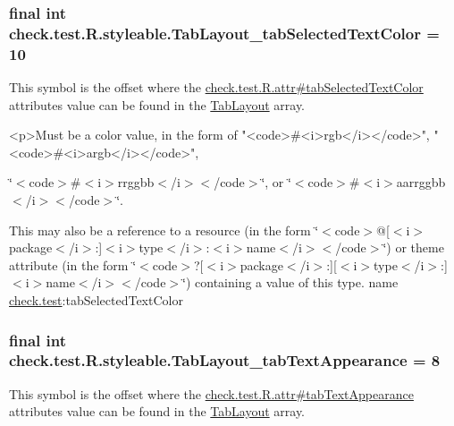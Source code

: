 \subsubsection[{Tab\+Layout\+\_\+tab\+Selected\+Text\+Color}]{\setlength{\rightskip}{0pt plus 5cm}final int check.\+test.\+R.\+styleable.\+Tab\+Layout\+\_\+tab\+Selected\+Text\+Color = 10\hspace{0.3cm}{\ttfamily [static]}}\label{classcheck_1_1test_1_1_r_1_1styleable_a8de68a289b7ff055235fa32b1699d7c0}
This symbol is the offset where the \hyperlink{classcheck_1_1test_1_1_r_1_1attr_a270a1ff857735c964f5bcf59290f4b71}{check.\+test.\+R.\+attr\#tab\+Selected\+Text\+Color} attribute\textquotesingle{}s value can be found in the \hyperlink{classcheck_1_1test_1_1_r_1_1styleable_a2a3232e8d38a43f5131a16385abbbed8}{Tab\+Layout} array.

\begin{DoxyVerb}      <p>Must be a color value, in the form of "<code>#<i>rgb</i></code>", "<code>#<i>argb</i></code>",
\end{DoxyVerb}
 \char`\"{}$<$code$>$\#$<$i$>$rrggbb$<$/i$>$$<$/code$>$\char`\"{}, or \char`\"{}$<$code$>$\#$<$i$>$aarrggbb$<$/i$>$$<$/code$>$\char`\"{}. 

This may also be a reference to a resource (in the form \char`\"{}$<$code$>$@\mbox{[}$<$i$>$package$<$/i$>$\+:\mbox{]}$<$i$>$type$<$/i$>$\+:$<$i$>$name$<$/i$>$$<$/code$>$\char`\"{}) or theme attribute (in the form \char`\"{}$<$code$>$?\mbox{[}$<$i$>$package$<$/i$>$\+:\mbox{]}\mbox{[}$<$i$>$type$<$/i$>$\+:\mbox{]}$<$i$>$name$<$/i$>$$<$/code$>$\char`\"{}) containing a value of this type.  name \hyperlink{namespacecheck_1_1test}{check.\+test}\+:tab\+Selected\+Text\+Color \hypertarget{classcheck_1_1test_1_1_r_1_1styleable_a72cd16a486f24d8a85c804b159034a9b}{}
\subsubsection[{Tab\+Layout\+\_\+tab\+Text\+Appearance}]{\setlength{\rightskip}{0pt plus 5cm}final int check.\+test.\+R.\+styleable.\+Tab\+Layout\+\_\+tab\+Text\+Appearance = 8\hspace{0.3cm}{\ttfamily [static]}}\label{classcheck_1_1test_1_1_r_1_1styleable_a72cd16a486f24d8a85c804b159034a9b}
This symbol is the offset where the \hyperlink{classcheck_1_1test_1_1_r_1_1attr_ab5c0ef23c7153d895773e5776a6bedee}{check.\+test.\+R.\+attr\#tab\+Text\+Appearance} attribute\textquotesingle{}s value can be found in the \hyperlink{classcheck_1_1test_1_1_r_1_1styleable_a2a3232e8d38a43f5131a16385abbbed8}{Tab\+Layout} array.

